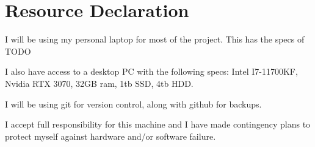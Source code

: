 \section*{Resource Declaration}

I will be using my personal laptop for most of the project. This has
the specs of TODO

I also have access to a desktop PC with the following specs:
Intel I7-11700KF, Nvidia RTX 3070, 32GB ram, 1tb SSD, 4tb HDD.

I will be using git for version control, along with github for backups.

I accept full responsibility for this machine and I have made contingency plans
to protect myself against hardware and/or software failure.
